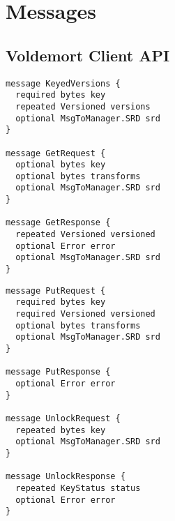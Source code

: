 \chapter{Messages}


\lstset{language=Protobuff,basicstyle=\small}

\section{Voldemort Client API}\label{appendix:voldemort_api}

\begin{multicols}{2}[]
\begin{lstlisting}
message KeyedVersions {
  required bytes key  
  repeated Versioned versions  
  optional MsgToManager.SRD srd  
}

message GetRequest {
  optional bytes key  
  optional bytes transforms  
  optional MsgToManager.SRD srd  
}

message GetResponse {
  repeated Versioned versioned  
  optional Error error  
  optional MsgToManager.SRD srd  
}
\end{lstlisting}

\columnbreak
\begin{lstlisting}
message PutRequest {
  required bytes key  
  required Versioned versioned  
  optional bytes transforms  
  optional MsgToManager.SRD srd  
}

message PutResponse {
  optional Error error  
}

message UnlockRequest {
  repeated bytes key  
  optional MsgToManager.SRD srd  
}

message UnlockResponse {
  repeated KeyStatus status  
  optional Error error  
}
\end{lstlisting}
\end{multicols}


\clearpage
